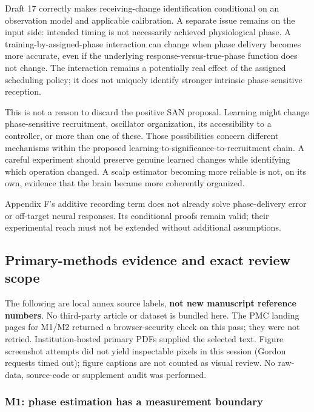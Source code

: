 \documentclass[
  american,
  11pt,
  letterpaper,
]{article}
\begin{document}
Draft 17 correctly makes receiving-change identification conditional on an observation model and applicable calibration. A separate issue remains on the input side: intended timing is not necessarily achieved physiological phase. A training-by-assigned-phase interaction can change when phase delivery becomes more accurate, even if the underlying response-versus-true-phase function does not change. The interaction remains a potentially real effect of the assigned scheduling policy; it does not uniquely identify stronger intrinsic phase-sensitive reception.

This is not a reason to discard the positive SAN proposal. Learning might change phase-sensitive recruitment, oscillator organization, its accessibility to a controller, or more than one of these. Those possibilities concern different mechanisms within the proposed learning-to-significance-to-recruitment chain. A careful experiment should preserve genuine learned changes while identifying which operation changed. A scalp estimator becoming more reliable is not, on its own, evidence that the brain became more coherently organized.

Appendix F's additive recording term does not already solve phase-delivery error or off-target neural responses. Its conditional proofs remain valid; their experimental reach must not be extended without additional assumptions.

\subsection{Primary-methods evidence and exact review scope}\label{primary-methods-evidence-and-exact-review-scope}

The following are local annex source labels, \textbf{not new manuscript reference numbers}. No third-party article or dataset is bundled here. The PMC landing pages for M1/M2 returned a browser-security check on this pass; they were not retried. Institution-hosted primary PDFs supplied the selected text. Figure screenshot attempts did not yield inspectable pixels in this session (Gordon requests timed out); figure captions are not counted as visual review. No raw-data, source-code or supplement audit was performed.

\subsubsection{M1: phase estimation has a measurement boundary}\label{m1-phase-estimation-has-a-measurement-boundary}
\end{document}
